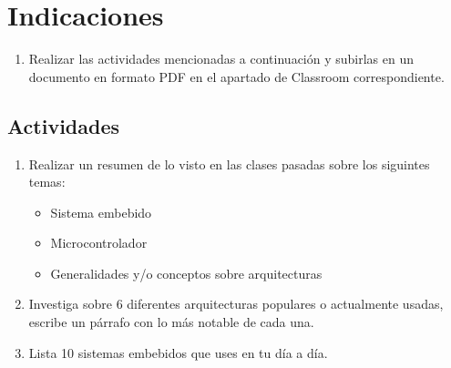 \documentclass[10pt,letterpaper]{article}
\begin{document}

\section*{Indicaciones}
\begin{enumerate}[label=(\roman*)]
    \item Realizar las actividades mencionadas a continuación y subirlas en un documento en formato PDF en el apartado de Classroom correspondiente. 
\end{enumerate}
\subsection*{Actividades}
\begin{enumerate}[label=\arabic*)]
    \item Realizar un resumen de lo visto en las clases pasadas sobre los siguintes temas:
    \begin{itemize}
        \item Sistema embebido
        \item Microcontrolador
        \item Generalidades y/o conceptos sobre arquitecturas 
    \end{itemize}
    \item Investiga sobre 6 diferentes arquitecturas populares o actualmente usadas, escribe un párrafo con lo más notable de cada una.
    \item Lista 10 sistemas embebidos que uses en tu día a día.
\end{enumerate}

\end{document}
